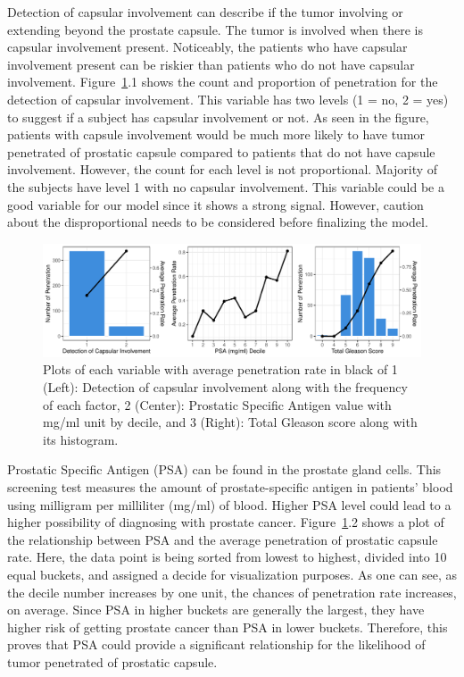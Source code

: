 \documentclass[11pt]{article}\usepackage[]{graphicx}\usepackage[]{color}
\makeatletter
\def\maxwidth{ %
  \ifdim\Gin@nat@width>\linewidth
    \linewidth
  \else
    \Gin@nat@width
  \fi
}
\makeatother
\begin{document}
\noindent Detection of capsular involvement can describe if the tumor involving or extending beyond the prostate capsule. The tumor is involved when there is capsular involvement present. Noticeably, the patients who have capsular involvement present can be riskier than patients who do not have capsular involvement. Figure~\ref{explore2}.1 shows the count and proportion of penetration for the detection of capsular involvement. This variable has two levels (1 = no, 2 = yes) to suggest if a subject has capsular involvement or not. As seen in the figure, patients with capsule involvement would be much more likely to have tumor penetrated of prostatic capsule compared to patients that do not have capsule involvement. However, the count for each level is not proportional. Majority of the subjects have level 1 with no capsular involvement. This variable could be a good variable for our model since it shows a strong signal. However, caution about the disproportional needs to be considered before finalizing the model.      

\begin{figure}[h!] 
\begin{center}

\includegraphics[width=\maxwidth]{figure/unnamed-chunk-2-1} 

\caption{Plots of each variable with average penetration rate in black of 1 (Left): Detection of capsular involvement along with the frequency of each factor, 2 (Center): Prostatic Specific Antigen value with mg/ml unit by decile, and 3 (Right): Total Gleason score along with its histogram.}
\label{explore2}
\end{center} 
\end{figure}

Prostatic Specific Antigen (PSA) can be found in the prostate gland cells. This screening test measures the amount of prostate-specific antigen in patients' blood using milligram per milliliter (mg/ml) of blood. Higher PSA level could lead to a higher possibility of diagnosing with prostate cancer. Figure~\ref{explore2}.2 shows a plot of the relationship between PSA and the average penetration of prostatic capsule rate. Here, the data point is being sorted from lowest to highest, divided into 10 equal buckets, and assigned a decide for visualization purposes. As one can see, as the decile number increases by one unit, the chances of penetration rate increases, on average. Since PSA in higher buckets are generally the largest, they have higher risk of getting prostate cancer than PSA in lower buckets. Therefore, this proves that PSA could provide a significant relationship for the likelihood of tumor penetrated of prostatic capsule.
\hfill \break
\end{document}
